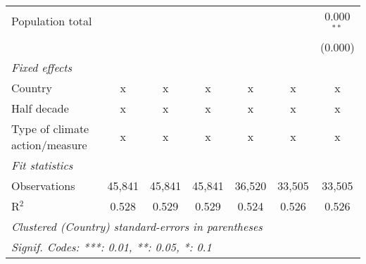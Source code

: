 \begin{tabular}{lcccccc}
   Population total                                              &              &               &               &                &                & 0.000$^{**}$\\   
                                                                 &              &               &               &                &                & (0.000)\\   
   \emph{Fixed effects}\\
   Country                                                       & x            & x             & x             & x              & x              & x\\  
   Half decade                                                   & x            & x             & x             & x              & x              & x\\  
   Type of climate action/measure                                & x            & x             & x             & x              & x              & x\\  
   \midrule \emph{Fit statistics}\\
   Observations                                                  & 45,841       & 45,841        & 45,841        & 36,520         & 33,505         & 33,505\\  
   R$^2$                                                         & 0.528        & 0.529         & 0.529         & 0.524          & 0.526          & 0.526\\  
   \midrule
   \multicolumn{7}{l}{\emph{Clustered (Country) standard-errors in parentheses}}\\
   \multicolumn{7}{l}{\emph{Signif. Codes: ***: 0.01, **: 0.05, *: 0.1}}\\
\end{tabular}
\par\endgroup


